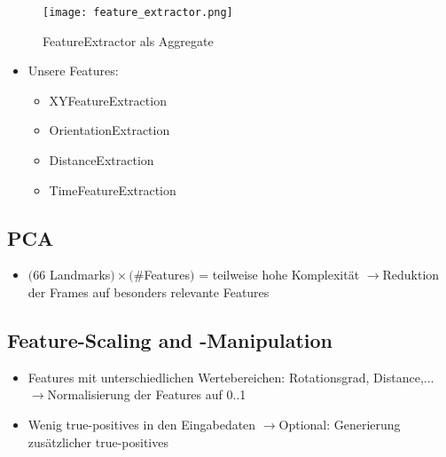 \documentclass{beamer}
\begin{document}
\begin{frame}
\begin{figure}
    \texttt{[image: feature\_extractor.png]}
    \caption{FeatureExtractor als Aggregate}
    \end{figure}
\end{frame}

\begin{frame}
\begin{itemize}
  \item Unsere Features:
    \begin{itemize}
      \item XYFeatureExtraction
      \item OrientationExtraction
      \item DistanceExtraction
      \item TimeFeatureExtraction
    \end{itemize}
  \end{itemize}
\end{frame}

\subsection{PCA}
\begin{frame}
  \begin{itemize}
    \item $($66 Landmarks$) \times ($\#Features$)$ = teilweise hohe Komplexität\newline
          $\rightarrow$Reduktion der Frames auf besonders relevante Features
  \end{itemize}
\end{frame}

\subsection{Feature-Scaling and -Manipulation}
\begin{frame}
  \begin{itemize}
    \item Features mit unterschiedlichen Wertebereichen: Rotationsgrad, Distance,...\newline
          $\rightarrow$Normalisierung der Features auf 0..1
    \item Wenig true-positives in den Eingabedaten\newline
          $\rightarrow$Optional: Generierung zusätzlicher true-positives
  \end{itemize}
\end{frame}
\end{document}
